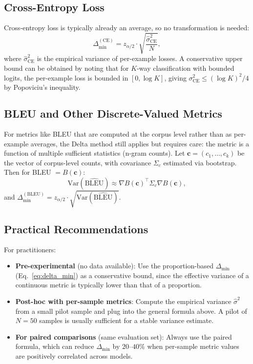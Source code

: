 \documentclass[pdflatex,sn-mathphys-ay,iicol]{sn-jnl}
\theoremstyle{thmstylethree}
\begin{document}
\begin{table}[t]
\begin{table}[t]
\subsection{Cross-Entropy Loss}

Cross-entropy loss is typically already an average, so no transformation is needed:
\[
\Delta_{\min}^{(\text{CE})} = z_{\alpha/2} \cdot \sqrt{\frac{\hat\sigma_{\text{CE}}^2}{N}},
\]
where $\hat\sigma_{\text{CE}}^2$ is the empirical variance of per-example losses. A conservative upper bound can be obtained by noting that for $K$-way classification with bounded logits, the per-example loss is bounded in $[0, \log K]$, giving $\sigma_{\text{CE}}^2 \leq (\log K)^2/4$ by Popoviciu's inequality.

\subsection{BLEU and Other Discrete-Valued Metrics}

For metrics like BLEU that are computed at the corpus level rather than as per-example averages, the Delta method still applies but requires care: the metric is a function of multiple sufficient statistics (n-gram counts). Let $\mathbf{c} = (c_1,\dots,c_k)$ be the vector of corpus-level counts, with covariance $\Sigma_c$ estimated via bootstrap. Then for BLEU $= B(\mathbf{c})$:
\[
\mathrm{Var}(\widehat{\text{BLEU}}) \approx \nabla B(\mathbf{c})^\top \Sigma_c \nabla B(\mathbf{c}),
\]
and $\Delta_{\min}^{(\text{BLEU})} = z_{\alpha/2} \cdot \sqrt{\mathrm{Var}(\widehat{\text{BLEU}})}$.

\subsection{Practical Recommendations}

For practitioners:
\begin{itemize}
    \item \textbf{Pre-experimental} (no data available): Use the proportion-based $\Delta_{\min}$ (Eq.~\ref{eq:delta_min}) as a conservative bound, since the effective variance of a continuous metric is typically lower than that of a proportion.
    \item \textbf{Post-hoc with per-sample metrics}: Compute the empirical variance $\hat\sigma^2$ from a small pilot sample and plug into the general formula above. A pilot of $N=50$ samples is usually sufficient for a stable variance estimate.
    \item \textbf{For paired comparisons} (same evaluation set): Always use the paired formula, which can reduce $\Delta_{\min}$ by $20$--$40\%$ when per-sample metric values are positively correlated across models.
\end{itemize}


\end{table}
\end{table}
\end{document}
